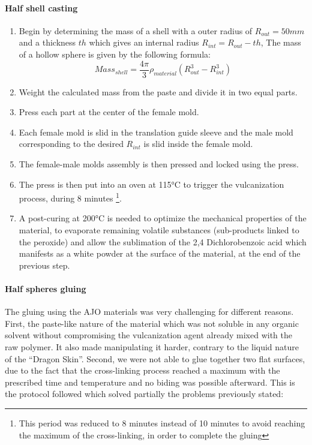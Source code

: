 \paragraph{Half shell casting}
\begin{enumerate}
	\item Begin by determining the mass of a shell with a outer radius of $R_{out}= 50 mm$ and a thickness $th$ which gives an internal radius $R_{int} = R_{out}-th$, The mass of a hollow sphere is given by the following formula:
		\[Mass_{shell} = \frac{4\pi}{3}\rho_{material} (R_{out}^3-R_{int}^3) \]

	\item Weight the calculated mass from the paste and divide it in two equal parts.
	\item Press each part at the center of the female mold.
	\item Each female mold is slid in the translation guide sleeve and the male mold corresponding to the desired $R_{int}$ is slid inside the female mold.
	\item The female-male molds assembly is then pressed and locked using the press.
	\item The press is then put into an oven at 115°C to trigger the vulcanization process, during 8 minutes \footnote{This period was reduced to 8 minutes instead of 10 minutes to avoid reaching the maximum of the cross-linking, in order to complete the gluing}.
	\item A post-curing at 200°C is needed to optimize the mechanical properties of the material, to evaporate remaining volatile substances (sub-products linked to the peroxide) and allow the sublimation of the 2,4 Dichlorobenzoic acid which manifests as a white powder at the surface of the material, at the end of the previous step.
\end{enumerate}

\paragraph{Half spheres gluing}
The gluing using the AJO materials was very challenging for different reasons. First, the paste-like nature of the material which was not soluble in any organic solvent without compromising the vulcanization agent already mixed with the raw polymer. It also made manipulating it harder, contrary to the liquid nature of the "`Dragon Skin"'. Second, we were not able to glue together two flat surfaces, due to the fact that the cross-linking process reached a maximum with the prescribed time and temperature and no biding was possible afterward.
This is the protocol followed which solved partially the problems previously stated:

